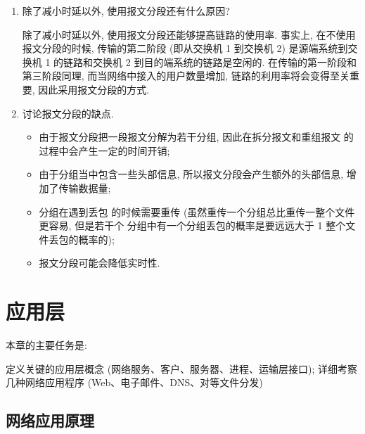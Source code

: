 \documentclass[10pt,UTF8]{book} %
\begin{document}
\begin{example}
\begin{enumerate}[label={$\left.\mathrm{\alph*}\right)$}, itemsep=0pt]
        \item 除了减小时延以外, 使用报文分段还有什么原因?
        \begin{sol}
            除了减小时延以外, 使用报文分段还能够提高链路的使用率. 事实上,
            在不使用报文分段的时候, 传输的第二阶段 (即从交换机 1 到交换机 2)
            是源端系统到交换机 1 的链路和交换机 2 到目的端系统的链路是空闲的.
            在传输的第一阶段和第三阶段同理, 而当网络中接入的用户数量增加,
            链路的利用率将会变得至关重要, 因此采用报文分段的方式.
        \end{sol}
        \item 讨论报文分段的缺点.
        \begin{itemize}[itemsep=0pt]
            \item 由于报文分段把一段报文分解为若干分组, 因此在拆分报文和重组报文
            的过程中会产生一定的时间开销;
            \item 由于分组当中包含一些头部信息, 所以报文分段会产生额外的头部信息, 
            增加了传输数据量; 
            \item 分组在遇到丢包
            的时候需要重传 (虽然重传一个分组总比重传一整个文件更容易, 但是若干个
            分组中有一个分组丢包的概率是要远远大于 1 整个文件丢包的概率的);
            \item 报文分段可能会降低实时性.
        \end{itemize}
    \end{enumerate}
\end{example}

\newpage
\thispagestyle{empty}

\chapter{应用层}

本章的主要任务是:
\begin{tasks}
    \task 定义关键的应用层概念 (网络服务、客户、服务器、进程、运输层接口);
    \task 详细考察几种网络应用程序 (Web、电子邮件、DNS、对等文件分发)
\end{tasks}

\section{网络应用原理}

\end{document}
